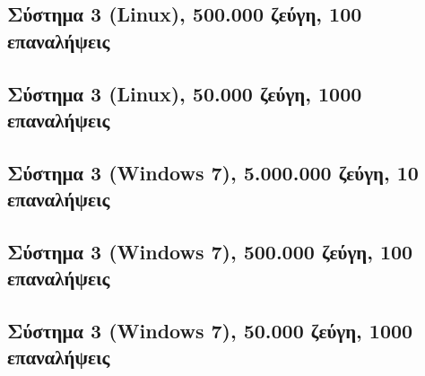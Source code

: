 \subsection*{Σύστημα 3 (Linux), 500.000 ζεύγη, 100 επαναλήψεις}\begin{center}
\tabcolsep=0.11cm
\scalebox{0.5}{
}
\scalebox{0.9}{
}\end{center}
\newpage

\subsection*{Σύστημα 3 (Linux), 50.000 ζεύγη, 1000 επαναλήψεις}\begin{center}
\tabcolsep=0.11cm
\scalebox{0.5}{
}
\scalebox{0.9}{
}\end{center}
\newpage

\subsection*{Σύστημα 3 (Windows 7), 5.000.000 ζεύγη, 10 επαναλήψεις}
\begin{center}
\tabcolsep=0.11cm
\scalebox{0.55}{}
\scalebox{0.9}{
}\end{center}
\newpage

\subsection*{Σύστημα 3 (Windows 7), 500.000 ζεύγη, 100 επαναλήψεις}\begin{center}
\tabcolsep=0.11cm
\scalebox{0.5}{
}
\scalebox{0.9}{
}\end{center}
\newpage

\subsection*{Σύστημα 3 (Windows 7), 50.000 ζεύγη, 1000 επαναλήψεις}\begin{center}
\tabcolsep=0.11cm
\scalebox{0.5}{
}
\scalebox{0.9}{
}\end{center}
\newpage



